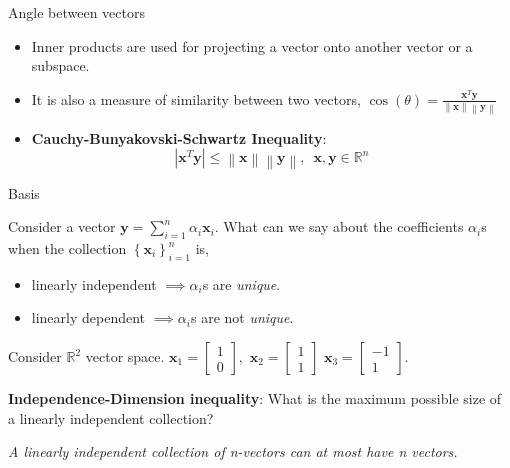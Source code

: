 \documentclass[aspectratio=169]{beamer}
\let\olditem\item
\renewcommand{\item}{\setlength{\itemsep}{\fill}\olditem}
\begin{document}
\begin{frame}[t]{Angle between vectors}
\vspace{-0.5cm}
\begin{itemize}
    \item Inner products are used for projecting a vector onto another vector or a subspace.
    \item It is also a measure of similarity between two vectors, $\cos \left(\theta\right) = \frac{\mathbf{x}^T\mathbf{y}}{\left\lVert \mathbf{x}\right\rVert \left\lVert \mathbf{y}\right\rVert}$
    \item \textbf{Cauchy-Bunyakovski-Schwartz Inequality}:
    \[ \left\lvert \mathbf{x}^T\mathbf{y} \right\rvert \leq \left\lVert \mathbf{x} \right\rVert \left\lVert \mathbf{y} \right\rVert, \,\,\, \mathbf{x}, \mathbf{y} \in \mathbb{R}^n \]
\end{itemize}
\end{frame}


\begin{frame}[t]{Basis}
\begin{small}
\noindent Consider a vector $\mathbf{y} = \sum_{i=1}^n\alpha_i\mathbf{x}_i$. What can we say about the coefficients $\alpha_i$s when the collection $\left\{\mathbf{x}_i\right\}_{i=1}^n$ is,
\begin{itemize}
\item linearly independent $\implies \alpha_i$s are \textit{unique}.
\item linearly dependent $\implies \alpha_i$s are not \textit{unique}.
\end{itemize}

Consider $\mathbb{R}^2$ vector space. $\mathbf{x}_1=\begin{bmatrix}1\\0\end{bmatrix}, \,\, \mathbf{x}_2=\begin{bmatrix}1\\1\end{bmatrix} \,\, \mathbf{x}_3 = \begin{bmatrix}-1\\1\end{bmatrix}$.
\begin{center}
\end{center}
\noindent \textbf{Independence-Dimension inequality}: What is the maximum possible size of a linearly independent collection?
\begin{center}\textit{A linearly independent collection of n-vectors can at most have n vectors.}\end{center}
\end{small}
\end{frame}
\end{document}
